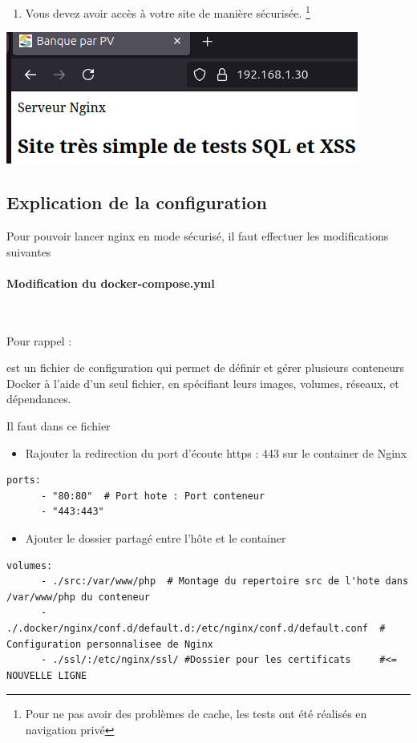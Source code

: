 \documentclass[french, 12pt]{article}%
\newcommand{\itemE}{\item[$\bullet$]}
\newcommand{\titreencadre}{Titre}
\newenvironment{encadre}[1]{\renewcommand{\titreencadre}{#1}
	\begin{mdframed}[style=encadrestyle]
	\vspace{0.5\baselineskip}
	}{%
	\end{mdframed}}
\begin{document}
\begin{enumerate}[resume]
\item Vous devez avoir accès à votre site de manière sécurisée. \footnote{Pour ne pas avoir des problèmes de cache, les tests ont été réalisés en navigation privé}
\end{enumerate}

\begin{center}
\includegraphics[scale=0.7]{./ressource/nginxHttps}
\end{center}

\newpage
\subsection{Explication de la configuration}
Pour pouvoir lancer nginx en mode sécurisé, il faut effectuer les modifications suivantes  

\paragraph{Modification du docker-compose.yml} \ 

Pour rappel  : 
\begin{encadre}{Un fichier \verb?docker-compose.yml?}
 est un fichier de configuration qui permet de définir et gérer plusieurs conteneurs Docker à l’aide d’un seul fichier, en spécifiant leurs images, volumes, réseaux, et dépendances.
\end{encadre}

Il faut dans ce fichier

\begin{itemize}
\itemE Rajouter la redirection du port d'écoute https : 443 sur le container de Nginx 
\end{itemize}

\begin{lstlisting}[style=commande]
ports:
      - "80:80"  # Port hote : Port conteneur
      - "443:443"
\end{lstlisting}

\begin{itemize}
\itemE Ajouter le dossier partagé entre l'hôte et le container
\end{itemize}
\begin{lstlisting}[style=commande]
volumes:
      - ./src:/var/www/php  # Montage du repertoire src de l'hote dans /var/www/php du conteneur
      - ./.docker/nginx/conf.d/default.d:/etc/nginx/conf.d/default.conf  # Configuration personnalisee de Nginx
      - ./ssl/:/etc/nginx/ssl/ #Dossier pour les certificats     #<= NOUVELLE LIGNE
\end{lstlisting}
\end{document}
